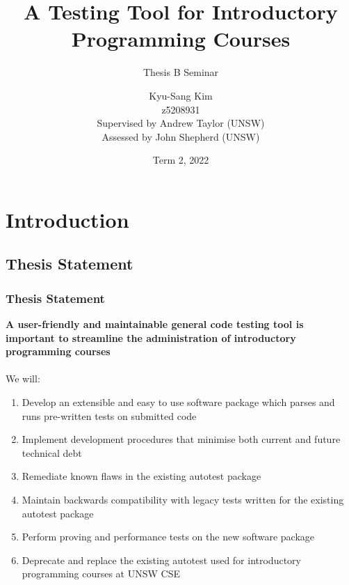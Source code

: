 \documentclass[xcolor]{beamer}
\author[Kyu-Sang Kim]{Kyu-Sang Kim\\z5208931\\\vspace{0.2cm}Supervised by Andrew Taylor (UNSW)\\Assessed by John Shepherd (UNSW)}
\title[Thesis B Seminar]{A Testing Tool for Introductory Programming Courses}
\subtitle{Thesis B Seminar}
\date{Term 2, 2022}
\begin{document}
\begin{frame}
	\titlepage
\end{frame}


\section{Introduction}
\subsection{Thesis Statement}
\begin{frame}
	\frametitle{Thesis Statement}
	\textbf{A user-friendly and maintainable general code testing tool is important to streamline the administration of introductory programming courses}
	\\~\\
	\pause
	We will:
	\begin{enumerate}
		\item Develop an extensible and easy to use software package which parses and runs pre-written tests on submitted code
		\pause
		\item Implement development procedures that minimise both current and future technical debt
		\pause
		\item Remediate known flaws in the existing autotest package
		\pause
		\item Maintain backwards compatibility with legacy tests written for the existing autotest package
		\pause
		\item Perform proving and performance tests on the new software package
		\pause
		\item Deprecate and replace the existing autotest used for introductory programming courses at UNSW CSE
	\end{enumerate}
\end{frame}
\end{document}

